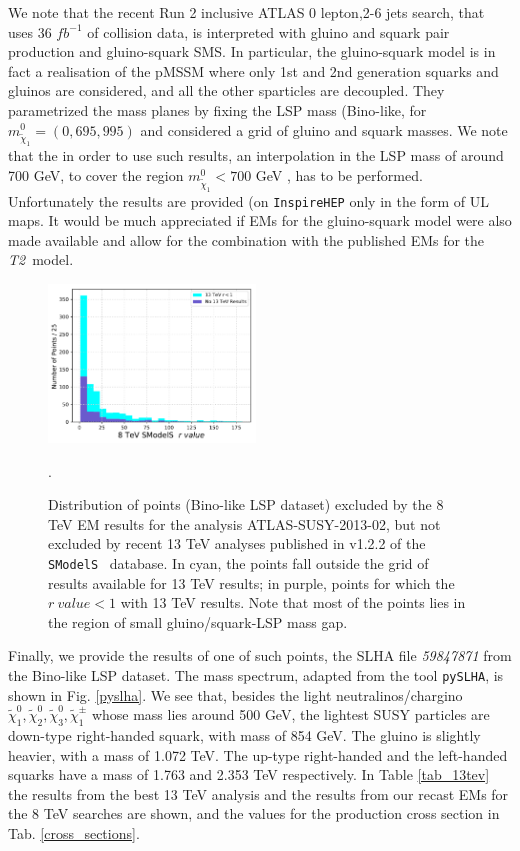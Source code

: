 \documentclass[a4paper,11pt]{article}
\newcommand{\SMO}{\texttt{SModelS\xspace}}
\newcommand{\Ttwo}{ \textit{T2}}
\begin{document}
%
We note that the recent Run 2 inclusive ATLAS 0 lepton,2-6 jets search\cite{Aaboud:2017vwy}, that uses 36 $fb^{-1}$ of collision data, is interpreted with gluino and squark pair production and gluino-squark SMS. In particular, the gluino-squark model is in fact a realisation of the pMSSM where only 1st and 2nd generation squarks and gluinos are considered, and all the other sparticles are decoupled. They parametrized the mass planes by fixing the LSP mass (Bino-like, for $m_{\tilde \chi _1} ^0 = (0,695,995)$ and considered a grid of gluino and squark masses. We note that the in order to use such results, an interpolation in the LSP mass of around 700 GeV, to cover the region $m_{\tilde \chi _1} ^0 < 700$ GeV , has to be performed. Unfortunately the results are provided (on \texttt{InspireHEP}\cite{HEP201607} only in the form of UL maps. It would be much appreciated if EMs for the gluino-squark model were also made available and allow for the combination with the published EMs for the \Ttwo~model. 
%
%
%
\begin{figure}
	\begin{center}
		
		\includegraphics[width=0.49\textwidth]{PLOTS/13TeV/rvalues.pdf}
		
	\end{center}
	\caption{Distribution of points (Bino-like LSP dataset) excluded by the 8 TeV EM results for the analysis ATLAS-SUSY-2013-02, but not excluded by recent 13 TeV analyses published in v1.2.2 of the \SMO~ database. In cyan, the points fall outside the grid of results available for 13 TeV results; in purple, points for which the $r \ value <1$ with 13 TeV results. Note that most of the points lies in the region of small gluino/squark-LSP mass gap.}. 
	\label{13TeVrvalue}
\end{figure}
Finally, we provide the results of one of such points, the SLHA file \textit{59847871} from the Bino-like LSP dataset. The mass spectrum, adapted from the tool \texttt{pySLHA}\cite{Buckley:2013jua}, is shown in Fig. \ref{pyslha}. We see that, besides the light neutralinos/chargino $\tilde \chi _1 ^0,\tilde \chi _2 ^0,\tilde \chi _3 ^0,\tilde \chi _1 ^{\pm}$ whose mass lies around 500 GeV, the lightest SUSY particles are down-type right-handed squark, with mass of 854 GeV. The gluino is slightly heavier, with a mass of 1.072 TeV. The up-type right-handed and the left-handed squarks have a mass of 1.763 and 2.353 TeV respectively. In Table \ref{tab_13tev} the results from the best 13 TeV analysis and the results from our recast EMs for the 8 TeV searches are shown, and the values for the production cross section in Tab. \ref{cross_sections}. 
\end{document}
